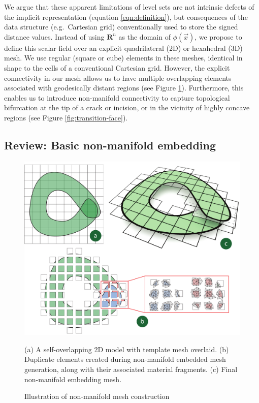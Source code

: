 We argue that these apparent limitations of level sets are not
intrinsic defects of the implicit representation (equation
\ref{eqn:definition}), but consequences of the data structure (e.g.\
Cartesian grid) conventionally used to store the signed distance
values. Instead of using $\mathbf{R}^n$ as the domain of
$\phi(\vec{x})$, we propose to define this scalar field over an
explicit quadrilateral (2D) or hexahedral (3D) mesh. We use regular
(square or cube) elements in these meshes, identical in shape to the
cells of a conventional Cartesian grid. However, the explicit
connectivity in our mesh allows us to have multiple overlapping
elements associated with geodesically distant regions (see Figure
\ref{fig:non-manifold-level-set-generation}). Furthermore, this
enables us to introduce non-manifold connectivity to capture
topological bifurcation at the tip of a crack or incision, or in the
vicinity of highly concave regions (see Figure
\ref{fig:transition-face}).

\subsection{Review: Basic non-manifold embedding}
\label{sec:stockembedding}

\begin{figure}
\centering
\includegraphics[width=.91\columnwidth]{chapter_nonmanifoldlevelsets/images/cshape_strip2.pdf}
\caption{Illustration of non-manifold mesh construction}{(a) A
  self-overlapping 2D model with template mesh overlaid. (b) Duplicate
  elements created during non-manifold embedded mesh generation, along
  with their associated material fragments. (c) Final non-manifold
  embedding mesh.  }
\label{fig:non-manifold-level-set-generation}
\end{figure}

